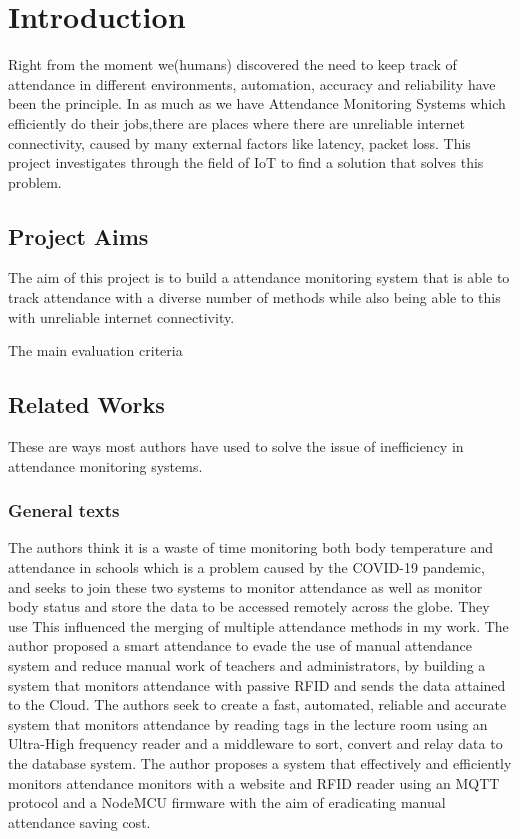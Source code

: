 \chapter{Introduction}
Right from the moment we(humans) discovered the need to keep track of attendance in different environments, automation, accuracy and reliability have been the principle. In as much as we have Attendance Monitoring Systems which efficiently do their jobs,there are places where there are unreliable internet connectivity, caused by many external factors like latency, packet loss. This project investigates through the field of IoT to find a solution that solves this problem.


\section{Project Aims}

The aim of this project is to build a attendance monitoring system that is able to track attendance with a diverse number of methods while also being able to this with unreliable internet connectivity. 

The main evaluation criteria


\section{Related Works} 
These are ways most authors have used to solve the issue of inefficiency in attendance monitoring systems.
\subsection{General texts}
The authors think it is a waste of time monitoring both body temperature and attendance in schools which is a problem caused by the COVID-19 pandemic, and seeks to join these two systems to monitor attendance as well as monitor body status and store the data to be accessed remotely across the globe. They use This influenced the merging of multiple attendance methods in my work.
The author proposed a smart attendance to evade the use of manual attendance system and reduce manual work of teachers and administrators, by building a system that monitors attendance with passive RFID and sends the data attained to the Cloud.
The authors seek to create a fast, automated, reliable and accurate system that monitors attendance by reading tags in the lecture room using an Ultra-High frequency reader and a middleware to sort, convert and relay data to the database system. 
The author proposes a system that effectively and efficiently monitors attendance monitors with a website and RFID reader using an MQTT protocol and a NodeMCU firmware with the aim of eradicating manual attendance saving cost.


